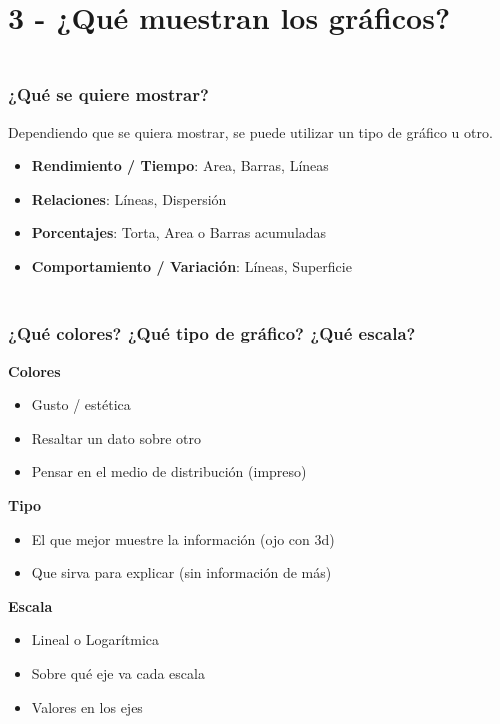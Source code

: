 \documentclass[aspectratio=169]{beamer}
\begin{document}
\section{3 - ¿Qué muestran los gráficos?}

\begin{frame}[fragile]
    \frametitle{ \vspace{-1cm} \flushright \colorbox{verdeuca}{ \small \textcolor{white}{ \footnotesize \secname } }\\
    ¿Qué se quiere mostrar?}
    Dependiendo que se quiera mostrar, se puede utilizar un tipo de gráfico u otro.
    \vskip 10pt
    \begin{itemize}
     \item \textbf{Rendimiento / Tiempo}: Area, Barras, Líneas
     \vskip 10pt
     \item \textbf{Relaciones}: Líneas, Dispersión
     \vskip 10pt
     \item \textbf{Porcentajes}: Torta, Area o Barras acumuladas
     \vskip 10pt
     \item \textbf{Comportamiento / Variación}: Líneas, Superficie
    \end{itemize}
\end{frame}

\begin{frame}[fragile]
    \frametitle{ \vspace{-1cm} \flushright \colorbox{verdeuca}{ \small \textcolor{white}{ \footnotesize \secname } }\\
    ¿Qué colores? ¿Qué tipo de gráfico? ¿Qué escala?}
    \textbf{Colores}
     \begin{itemize}
      \item Gusto / estética
      \item Resaltar un dato sobre otro
      \item Pensar en el medio de distribución (impreso)
     \end{itemize}
    \vskip 10pt
    \textbf{Tipo}
     \begin{itemize}
      \item El que mejor muestre la información (ojo con 3d)
      \item Que sirva para explicar (sin información de más)
     \end{itemize}
     \vskip 10pt
    \textbf{Escala}
     \begin{itemize}
      \item Lineal o Logarítmica
      \item Sobre qué eje va cada escala
      \item Valores en los ejes
     \end{itemize}
\end{frame}
\end{document}
